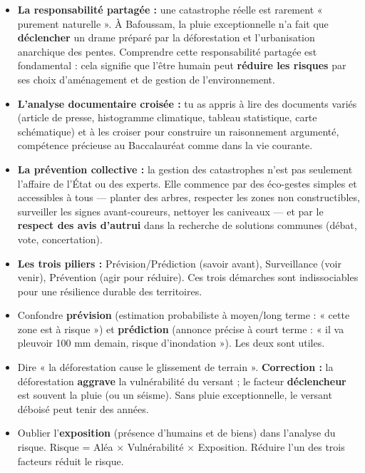 \documentclass[11pt]{article}
\newcommand{\cle}[1]{{\popxbold\color{popdark}#1}}
\begin{document}
\begin{itemize}
\item \textbf{La responsabilité partagée :} une catastrophe réelle est rarement « purement naturelle ». À Bafoussam, la pluie exceptionnelle n'a fait que \textbf{déclencher} un drame préparé par la déforestation et l'urbanisation anarchique des pentes. Comprendre cette \cle{responsabilité partagée} est fondamental : cela signifie que l'être humain peut \textbf{réduire les risques} par ses choix d'aménagement et de gestion de l'environnement.
\item \textbf{L'analyse documentaire croisée :} tu as appris à lire des documents variés (article de presse, histogramme climatique, tableau statistique, carte schématique) et à les croiser pour construire un raisonnement argumenté, compétence précieuse au Baccalauréat comme dans la vie courante.
\item \textbf{La prévention collective :} la gestion des catastrophes n'est pas seulement l'affaire de l'État ou des experts. Elle commence par des \cle{éco-gestes} simples et accessibles à tous — planter des arbres, respecter les zones non constructibles, surveiller les signes avant-coureurs, nettoyer les caniveaux — et par le \textbf{respect des avis d'autrui} dans la recherche de solutions communes (débat, vote, concertation).
\item \textbf{Les trois piliers :} \cle{Prévision/Prédiction} (savoir avant), \cle{Surveillance} (voir venir), \cle{Prévention} (agir pour réduire). Ces trois démarches sont indissociables pour une résilience durable des territoires.
\end{itemize}

\begin{attention}
\begin{itemize}
\item Confondre \textbf{prévision} (estimation probabiliste à moyen/long terme : « cette zone est à risque ») et \textbf{prédiction} (annonce précise à court terme : « il va pleuvoir 100 mm demain, risque d'inondation »). Les deux sont utiles.
\item Dire « la déforestation cause le glissement de terrain ». \textbf{Correction :} la déforestation \textbf{aggrave} la vulnérabilité du versant ; le facteur \textbf{déclencheur} est souvent la pluie (ou un séisme). Sans pluie exceptionnelle, le versant déboisé peut tenir des années.
\item Oublier l'\textbf{exposition} (présence d'humains et de biens) dans l'analyse du risque. Risque = Aléa $\times$ Vulnérabilité $\times$ Exposition. Réduire l'un des trois facteurs réduit le risque.
\end{itemize}
\end{attention}
\end{document}
